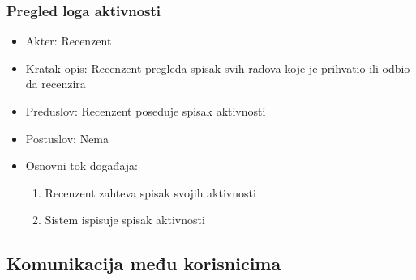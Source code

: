 \documentclass[a4paper]{article}
\begin{document}
\subsubsection{Pregled loga aktivnosti}
\begin{itemize}
    \item Akter: Recenzent
    \item Kratak opis: Recenzent pregleda spisak svih radova koje je prihvatio ili odbio da recenzira
    \item Preduslov: Recenzent poseduje spisak aktivnosti
    \item Postuslov: Nema
    \item Osnovni tok događaja:
        \begin{enumerate}
            \item Recenzent zahteva spisak svojih aktivnosti
            \item Sistem ispisuje spisak aktivnosti
        \end{enumerate}
\end{itemize}

\subsection{Komunikacija među korisnicima}
\end{document}
